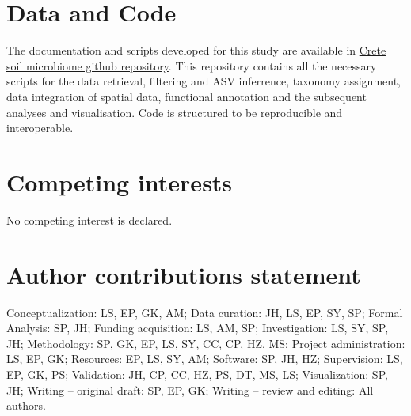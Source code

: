 \documentclass[unnumsec,webpdf,contemporary,large]{oup-authoring-template}%
\theoremstyle{thmstyleone}%
\theoremstyle{thmstyletwo}%
\theoremstyle{thmstylethree}%
\begin{document}
%
%
%
%
%
%
\section{Data and Code}
The documentation and scripts developed for this study are available in
\href{https://github.com/savvas-paragkamian/crete_soil_microbiome/}{Crete soil microbiome github repository}.
This repository contains all the necessary scripts for the data retrieval,
filtering and ASV inferrence, taxonomy assignment, data integration of spatial data, 
functional annotation and the subsequent analyses and visualisation.
Code is structured to be reproducible and interoperable.

\section{Competing interests}
No competing interest is declared.

\section{Author contributions statement}
Conceptualization: LS, EP, GK, AM;
Data curation: JH, LS, EP, SY, SP;
Formal Analysis: SP, JH;
Funding acquisition: LS, AM, SP;
Investigation: LS, SY, SP, JH;
Methodology: SP, GK, EP, LS, SY, CC, CP, HZ, MS;
Project administration: LS, EP, GK;
Resources: EP, LS, SY, AM;
Software: SP, JH, HZ;
Supervision: LS, EP, GK, PS;
Validation: JH, CP, CC, HZ, PS, DT, MS, LS;
Visualization: SP, JH;
Writing – original draft: SP, EP, GK;
Writing – review and editing: All authors.
\end{document}
